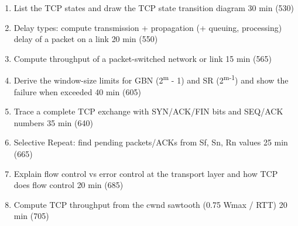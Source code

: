 \begin{enumerate}[itemsep=0pt]
\item List the TCP states and draw the TCP state transition diagram  {\scriptsize\color{muted}30 min (530)}
\item Delay types: compute transmission + propagation (+ queuing, processing) delay of a packet on a link  {\scriptsize\color{muted}20 min (550)}
\item Compute throughput of a packet-switched network or link  {\scriptsize\color{muted}15 min (565)}
\item Derive the window-size limits for GBN (2\textsuperscript{m} - 1) and SR (2\textsuperscript{m-1}) and show the failure when exceeded  {\scriptsize\color{muted}40 min (605)}
\item Trace a complete TCP exchange with SYN/ACK/FIN bits and SEQ/ACK numbers  {\scriptsize\color{muted}35 min (640)}
\item Selective Repeat: find pending packets/ACKs from Sf, Sn, Rn values  {\scriptsize\color{muted}25 min (665)}
\item Explain flow control vs error control at the transport layer and how TCP does flow control  {\scriptsize\color{muted}20 min (685)}
\item Compute TCP throughput from the cwnd sawtooth (0.75 Wmax / RTT)  {\scriptsize\color{muted}20 min (705)}
\end{enumerate}
